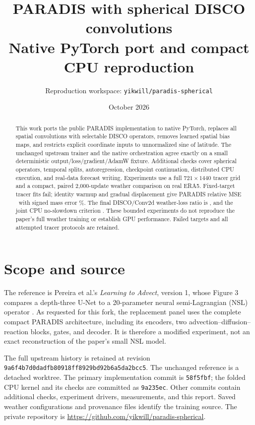 \documentclass[10pt]{article}
\title{PARADIS with spherical DISCO convolutions\\\large Native PyTorch port and compact CPU reproduction}
\author{Reproduction workspace: \texttt{yikwill/paradis-spherical}}
\date{October 2026}
\begin{document}
\maketitle
\begin{abstract}
This work ports the public PARADIS implementation to native PyTorch, replaces all
spatial convolutions with selectable DISCO operators, removes learned spatial bias
maps, and restricts explicit coordinate inputs to unnormalized sine of latitude.
The unchanged upstream trainer and the native orchestration agree exactly on a
small deterministic output/loss/gradient/AdamW fixture. Additional checks cover
spherical operators, temporal splits, autoregression, checkpoint continuation,
distributed CPU execution, and real-data forecast writing. Experiments use a full
$721\times1440$ tracer grid and a compact, paired 2,000-update weather comparison
on real ERA5. Fixed-target tracer fits fail; identity warmup and gradual displacement
give PARADIS relative MSE \WarmTracerRatio\ with signed mass error \WarmTracerMass\%.
The final DISCO/Conv2d weather-loss ratio is \WeatherRatio, and the joint CPU
no-slowdown criterion \SpeedGate. These bounded experiments do not reproduce the
paper's full weather training or establish GPU performance. Failed targets and
all attempted tracer protocols are retained.
\end{abstract}

\section{Scope and source}
The reference is Pereira et al.'s \emph{Learning to Advect}, version 1, whose
Figure 3 compares a depth-three U-Net to a 20-parameter neural semi-Lagrangian
(NSL) operator \cite{paradis}. As requested for this fork, the replacement panel
uses the complete compact PARADIS architecture, including its encoders, two
advection--diffusion--reaction blocks, gates, and decoder. It is therefore a
modified experiment, not an exact reconstruction of the paper's small NSL model.

The full upstream history is retained at revision
\texttt{9a6f4b7d0dadfb80918ff8929bd92b6a5da2bcc5}.
The unchanged reference is a detached worktree. The primary implementation commit
is \texttt{58f5fbf}; the folded CPU
kernel and its checks are committed as \texttt{9a235ec}. Other commits contain
additional checks, experiment drivers, measurements, and this report.
Saved weather configurations and provenance files identify the training source.
The private repository is \url{https://github.com/yikwill/paradis-spherical}.
\end{document}
